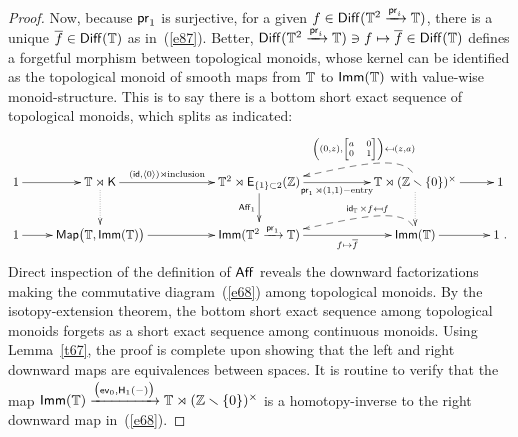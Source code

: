 \begin{proof}
Now, because $\operatorname{\mathsf{pr}}_1$ is surjective, for a given $f\in \operatorname{{\sf Diff}}(\mathbb T^2 \xrightarrow{\operatorname{\mathsf{pr}}_i} \mathbb T)$, there is a unique $\overline{f}\in \operatorname{{\sf Diff}}(\mathbb T)$ as in~(\ref{e87}).
Better, $\operatorname{{\sf Diff}}(\mathbb T^2 \xrightarrow{\operatorname{\mathsf{pr}}_i}\mathbb T) \ni f\mapsto \overline{f} \in \operatorname{{\sf Diff}}(\mathbb T)$ defines a forgetful morphism between topological monoids, whose kernel can be identified as the topological monoid of smooth maps from $\mathbb T$ to $\operatorname{\sf Imm}(\mathbb T)$ with value-wise monoid-structure.
This is to say
there is a bottom short exact sequence of topological monoids, which splits as indicated:
\begin{equation}
\label{e68}
\xymatrix{
1
\ar[r] 
&
\TT \rtimes \sK
\ar@{..>}[d]
\ar[rr]^-{ (\id , \lag 0 \rag) \rtimes {\rm inclusion}}
&&
\TT^2 \rtimes \sE_{\{1\}\subset 2}(\ZZ)
\ar[d]_-{\Aff_1}
\ar[rr]_-{\pr_1 \rtimes (1,1)-{\rm entry}}
&&
\TT \rtimes (\ZZ \smallsetminus \{0\})^\times
\ar@{..>}[d]
\ar[r]
\ar@{-->}@(u,-)[ll]_-{ \left((0, z)  , { \mbox{\scriptsize$\begin{bmatrix} a & 0 \\ 0 & 1 \end{bmatrix}$}}\right) \mapsfrom (z, a) }
&
1
\\
1
\ar[r] 
&
\Map\bigl( \TT , \Imm(\TT) \bigr) 
\ar[rr]
&&
\Imm(\TT^2 \xra{\pr_1} \TT)
\ar[rr]_-{ f \mapsto \ov{f} }
&&
\Imm(\TT)
\ar[r]
\ar@{-->}@(u,-)[ll]_-{ \id_{\TT}\times f \mapsfrom f }
&
1
~
.
}
\end{equation}
Direct inspection of the definition of $\operatorname{\sf Aff}$ reveals the downward factorizations making the commutative diagram~(\ref{e68}) among topological monoids. 
By the isotopy-extension theorem, the bottom short exact sequence among topological monoids forgets as a short exact sequence among continuous monoids. 
Using Lemma~\ref{t67},
the proof is complete upon showing that the left and right downward maps are equivalences between spaces.
It is routine to verify that the map $\operatorname{\sf Imm}(\mathbb T) \xrightarrow{\bigl(\operatorname{\mathsf{ev}}_0 , \mathsf H_1(-)\bigr)} \mathbb T \rtimes (\mathbb Z \smallsetminus \{0\})^\times$ is a homotopy-inverse to the right downward map in~(\ref{e68}).



\end{proof}
